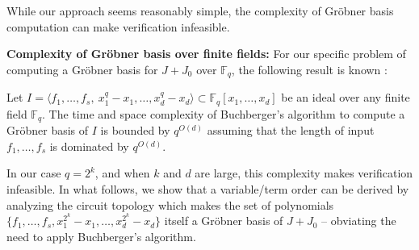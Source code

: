While our approach seems reasonably simple, the complexity of
Gr\"obner basis computation can make verification infeasible. 




{\bf Complexity of Gr\"obner basis over finite fields:} For our
specific problem of computing a Gr\"obner basis for $J + J_0$ over
$\mathbb{F}_{q}$, the following result is known \cite{gao:gf-gb-ms}:

\begin{Theorem}\label{thm:gb-complexity}
Let $I = \langle f_1, \dots, f_s, ~x_1^q - x_1, \dots, x_d^q -
x_d\rangle \subset \mathbb{F}_{q}[x_1, \dots, x_d]$ be an ideal over
any finite field $\mathbb{F}_{q}$. The time and space complexity of
Buchberger's algorithm to compute a Gr\"obner basis of $I$ is bounded
by $q^{O(d)}$ assuming that the length of input $f_1, \dots, f_s$ is
dominated by $q^{O(d)}$.  
\end{Theorem}

In our case $q = 2^k$, and when $k$ and $d$ are large, this complexity
makes verification infeasible. 
In what follows, we show that a variable/term order can be derived by
analyzing the circuit topology which makes the set of polynomials
$\{f_1, \dots,f_s, x_1^{2^k} - x_1, \dots, x_d^{2^k} - x_d\}$ itself a
Gr\"obner basis of $J+J_0$ -- obviating the need to apply Buchberger's
algorithm. 

